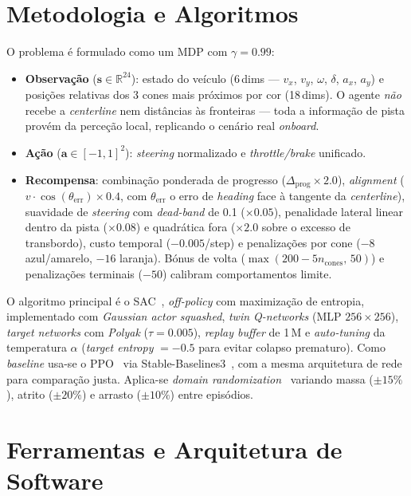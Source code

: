 \documentclass[runningheads]{llncs}
\begin{document}
\section{Metodologia e Algoritmos}

O problema é formulado como um MDP com $\gamma = 0.99$:
\begin{itemize}[nosep,leftmargin=*]
    \item \textbf{Observação} ($\mathbf{s} \in \mathbb{R}^{24}$): estado do veículo (6\,dims --- $v_x$, $v_y$, $\omega$, $\delta$, $a_x$, $a_y$) e posições relativas dos 3 cones mais próximos por cor (18\,dims). O agente \emph{não} recebe a \textit{centerline} nem distâncias às fronteiras --- toda a informação de pista provém da perceção local, replicando o cenário real \textit{onboard}.
    \item \textbf{Ação} ($\mathbf{a} \in [-1, 1]^2$): \textit{steering} normalizado e \textit{throttle/brake} unificado.
    \item \textbf{Recompensa}: combinação ponderada de progresso ($\Delta_\mathrm{prog} \times 2.0$), \textit{alignment} ($v \cdot \cos(\theta_\mathrm{err}) \times 0.4$, com $\theta_\mathrm{err}$ o erro de \textit{heading} face à tangente da \textit{centerline}), suavidade de \textit{steering} com \textit{dead-band} de 0.1 ($\times 0.05$), penalidade lateral linear dentro da pista ($\times 0.08$) e quadrática fora ($\times 2.0$ sobre o excesso de transbordo), custo temporal ($-0.005$/step) e penalizações por cone ($-8$ azul/amarelo, $-16$ laranja). Bónus de volta ($\max(200 - 5 n_\mathrm{cones},\, 50)$) e penalizações terminais ($-50$) calibram comportamentos limite.
\end{itemize}

O algoritmo principal é o SAC~\cite{haarnoja2018}, \textit{off-policy} com maximização de entropia, implementado com \textit{Gaussian actor squashed}, \textit{twin Q-networks} (MLP $256{\times}256$), \textit{target networks} com \textit{Polyak} ($\tau{=}0.005$), \textit{replay buffer} de 1\,M e \textit{auto-tuning} da temperatura $\alpha$ (\textit{target entropy} $=-0.5$ para evitar colapso prematuro). Como \textit{baseline} usa-se o PPO~\cite{schulman2017} via Stable-Baselines3~\cite{raffin2021}, com a mesma arquitetura de rede para comparação justa. Aplica-se \textit{domain randomization}~\cite{tobin2017,ulrich2024} variando massa ($\pm 15\%$), atrito ($\pm 20\%$) e arrasto ($\pm 10\%$) entre episódios.

\section{Ferramentas e Arquitetura de Software}
\end{document}
